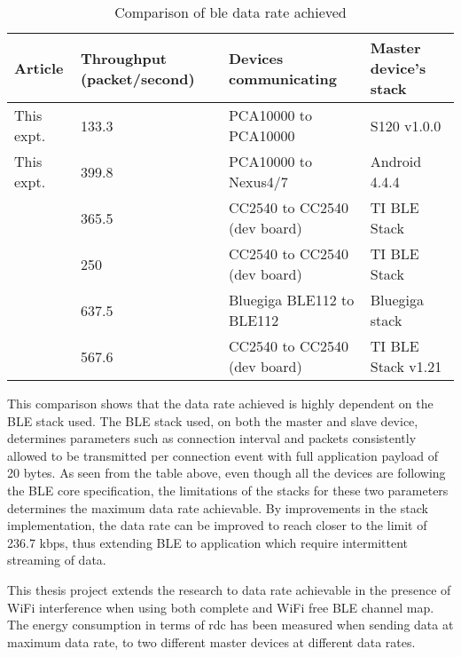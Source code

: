 \begin{table}[h]
\centering
\setlength{\extrarowheight}{1.5pt}
    \begin{tabular}[c]{|l|m{2.7cm}|l|l|}
    \hline
    Article    & Throughput (packet/second) & Devices communicating & Master device's stack \\ \hline
    This expt. & 133.3 & PCA10000 to PCA10000 & S120 v1.0.0    \\ \hline
    This expt. & 399.8 & PCA10000 to Nexus4/7 & Android 4.4.4  \\ \hline
    \cite{Gomez2012} & 365.5 & CC2540 to CC2540 (dev board) & TI BLE Stack \\ \hline
    \cite{Mackensen2012} & 250 & CC2540 to CC2540 (dev board) & TI BLE Stack \\ \hline
    \cite{Kindt2014} & 637.5 & Bluegiga BLE112 to BLE112 & Bluegiga stack \cite{MikkoSavolainen} \\ \hline
    \cite{Mikhaylov2013} & 567.6 & CC2540 to CC2540 (dev board) & TI BLE Stack v1.21 \\ \hline
    \end{tabular}
    \caption{Comparison of \gls{ble} data rate achieved}
    \vspace{-10pt}
    \label{tbl:dataRate}
\end{table}

This comparison shows that the data rate achieved is highly dependent on the BLE stack used. The BLE stack used, on both the master and slave device, determines parameters such as connection interval and packets consistently allowed to be transmitted per connection event with full application payload of 20 bytes. As seen from the table above, even though all the devices are following the BLE core specification, the limitations of the stacks for these two parameters determines the maximum data rate achievable. By improvements in the stack implementation, the data rate can be improved to reach closer to the limit of 236.7 kbps, thus extending BLE to application which require intermittent streaming of data.

This thesis project extends the research to data rate achievable in the presence of WiFi interference when using both complete and WiFi free BLE channel map. The energy consumption in terms of \gls{rdc} has been measured when sending data at maximum data rate, to two different master devices at different data rates.

